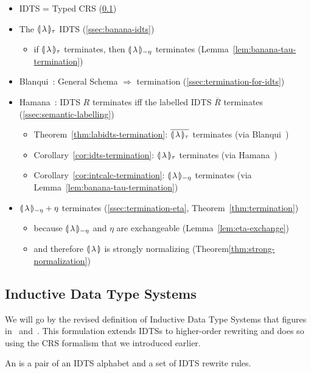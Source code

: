 \begin{itemize}
\item IDTS = Typed CRS (\ref{ssec:idts})
\item The ${\llparenthesis \, \lambda \, \rrparenthesis_\tau}$ IDTS (\ref{ssec:banana-idts})
  \begin{itemize}
  \item if ${\llparenthesis \, \lambda \, \rrparenthesis_\tau}$ terminates, then ${\llparenthesis \, \lambda \, \rrparenthesis_{-\eta}}$ terminates
    (Lemma~\ref{lem:banana-tau-termination})
  \end{itemize}
\item Blanqui~\cite{blanqui2000termination}: General Schema $\Rightarrow$
  termination (\ref{ssec:termination-for-idts})
\item Hamana~\cite{hamana2007higher}: IDTS $R$ terminates iff the labelled
  IDTS $\overline{R}$ terminates (\ref{ssec:semantic-labelling})
  \begin{itemize}
  \item Theorem~\ref{thm:labidts-termination}: ${\overline{\llparenthesis \, \lambda \, \rrparenthesis_\tau}}$ terminates (via
    Blanqui~\cite{blanqui2000termination})
  \item Corollary~\ref{cor:idts-termination}: ${\llparenthesis \, \lambda \, \rrparenthesis_\tau}$ terminates (via
    Hamana~\cite{hamana2007higher})
  \item Corollary~\ref{cor:intcalc-termination}: ${\llparenthesis \, \lambda \, \rrparenthesis_{-\eta}}$ terminates (via
    Lemma~\ref{lem:banana-tau-termination})
  \end{itemize}
\item ${\llparenthesis \, \lambda \, \rrparenthesis_{-\eta}} + \eta$ terminates (\ref{ssec:termination-eta},
  Theorem~\ref{thm:termination})
  \begin{itemize}
  \item because ${\llparenthesis \, \lambda \, \rrparenthesis_{-\eta}}$ and $\eta$ are exchangeable
    (Lemma~\ref{lem:eta-exchange})
  \item and therefore ${\llparenthesis \, \lambda \, \rrparenthesis}$ is strongly normalizing
    (Theorem\ref{thm:strong-normalization})
  \end{itemize}
\end{itemize}


\subsection{Inductive Data Type Systems}
\label{ssec:idts}

We will go by the revised definition of Inductive Data Type Systems that
figures in~\cite{blanqui2000termination} and~\cite{hamana2007higher}. This
formulation extends IDTSs to higher-order rewriting and does so using the
CRS formalism that we introduced earlier.

\begin{definition}
  An  is a pair of an IDTS alphabet
  and a set of IDTS rewrite rules.
\end{definition}

